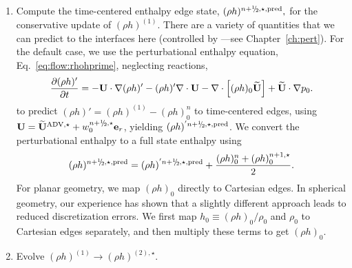 \begin{description}
\begin{enumerate}
\begin{enumerate}
\renewcommand{\labelenumii}{{\bf \roman{enumii}}.}

\item Compute the time-centered enthalpy edge state, $(\rho h)^{\nph,\star,\pred},$
  for the conservative update of $(\rho h)^{(1)}$.  There are a
   variety of quantities that we can predict to the interfaces here
   (controlled by ---see
   Chapter~\ref{ch:pert}).  For the default case, we use the
   perturbational enthalpy equation, Eq.~\ref{eq:flow:rhohprime}, neglecting reactions,
\begin{equation}
\frac{\partial(\rho h)'}{\partial t} = -{\bf U}\cdot\nabla(\rho h)' - 
   (\rho h)'\nabla\cdot{\bf U} - \nabla\cdot\left[(\rho h)_0\widetilde{{\bf U}}\right] + \widetilde{{\bf U}}\cdot\nabla p_0 
    \label{eq:Perturbational Enthalpy}.
\end{equation}
  to predict
  $(\rho h)' = (\rho h)^{(1)} - (\rho h)_0^n$ to time-centered edges, 
  using $\Ub = \uadvone+w_0^{\nph,\star} \eb_r$,
  yielding $(\rho h)^{'\nph,\star,\pred}$.  We convert the perturbational 
  enthalpy to a full state enthalpy using
\begin{equation}
(\rho h)^{\nph,\star,\pred} = (\rho h)^{'\nph,\star,\pred} + \frac{(\rho h)_0^n + (\rho h)_0^{n+1,\star}}{2}.
\end{equation}
  For planar geometry, we map $(\rho h)_0$ directly to Cartesian edges.
  In spherical geometry, our experience has shown that a slightly different
  approach leads to reduced discretization errors.  We first map 
  $h_0 \equiv (\rho h)_0/\rho_0$ and $\rho_0$ to Cartesian edges separately, 
  and then multiply these terms to get $(\rho h)_0$.

\item Evolve $(\rho h)^{(1)} \rightarrow (\rho h)^{(2),\star}$.


\end{enumerate}
\end{enumerate}
\end{description}
